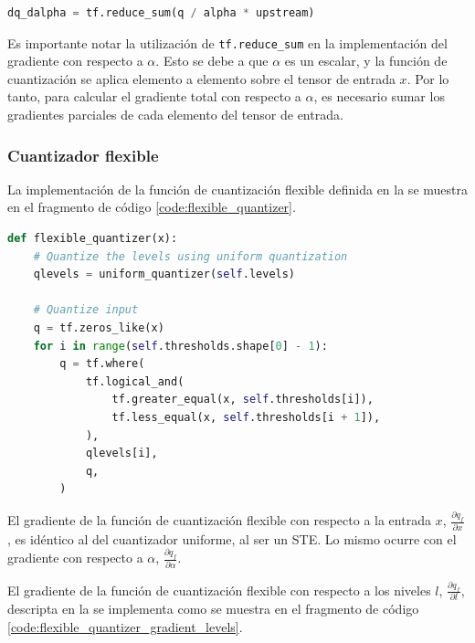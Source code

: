 \begin{lstlisting}[language=Python,label=code:uniform_quantizer_gradient_alpha,caption=Definición del gradiente de la función de cuantización uniforme con respecto al parámetro $\alpha$.]
  dq_dalpha = tf.reduce_sum(q / alpha * upstream)
\end{lstlisting}

Es importante notar la utilización de \texttt{tf.reduce\_sum} en la implementación del gradiente con respecto a $\alpha$. Esto se debe a que $\alpha$ es un escalar, y la función de cuantización se aplica elemento a elemento sobre el tensor de entrada $x$. Por lo tanto, para calcular el gradiente total con respecto a $\alpha$, es necesario sumar los gradientes parciales de cada elemento del tensor de entrada.


\subsubsection{Cuantizador flexible}

La implementación de la función de cuantización flexible definida en la  se muestra en el fragmento de código \ref{code:flexible_quantizer}.

\begin{lstlisting}[language=Python,label=code:flexible_quantizer,caption=Definición de la función de cuantización flexible.]
  def flexible_quantizer(x):
    # Quantize the levels using uniform quantization
    qlevels = uniform_quantizer(self.levels)

    # Quantize input
    q = tf.zeros_like(x)
    for i in range(self.thresholds.shape[0] - 1):
        q = tf.where(
            tf.logical_and(
                tf.greater_equal(x, self.thresholds[i]),
                tf.less_equal(x, self.thresholds[i + 1]),
            ),
            qlevels[i],
            q,
        )
\end{lstlisting}

El gradiente de la función de cuantización flexible con respecto a la entrada $x$, $\frac{\partial q_{f}}{\partial x}$, es idéntico al del cuantizador uniforme, al ser un STE. Lo mismo ocurre con el gradiente con respecto a $\alpha$, $\frac{\partial q_{f}}{\partial \alpha}$.

El gradiente de la función de cuantización flexible con respecto a los niveles $l$, $\frac{\partial q_{f}}{\partial l}$, descripta en la  se implementa como se muestra en el fragmento de código \ref{code:flexible_quantizer_gradient_levels}.

